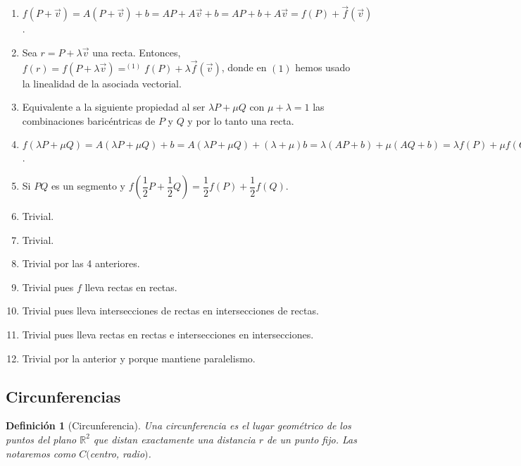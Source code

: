 \documentclass[11pt, a4paper]{article}
\makeatletter
\newif\IfInSansMode
\let\oldsf\sffamily
\renewcommand*{\sffamily}{\oldsf\mathversion{sans}\InSansModetrue}
\let\oldnorm\normalfont
\renewcommand*{\normalfont}{\oldnorm\InSansModefalse\mathversion{normal}}
\renewenvironment{proof}[1][\proofname] {\vspace{-15pt}\par\pushQED{\qed}\normalfont\topsep6\p@\@plus6\p@\relax\trivlist\item[\hskip\labelsep\it#1\@addpunct{.}]\ignorespaces}{\popQED\endtrivlist\@endpefalse}
\newcommand{\R}{\mathbb{R}}
\renewcommand{\vec}{\overrightarrow}
\renewenvironment{proof}[1][\proofname] {\par\pushQED{\qed}\normalfont\topsep6\p@\@plus6\p@\relax\trivlist\item[\hskip\labelsep\itshape\sffamily#1\@addpunct{.}]\ignorespaces}{\popQED\endtrivlist\@endpefalse}
\theoremstyle{theorem-style}
\theoremstyle{definition-style}
\newtheorem{ndef}{Definición}[section]
\theoremstyle{remark-style}
\newtheorem*{nota}{Nota}
\theoremstyle{example-style}
\makeatother
\begin{document}
\begin{proof}\hfill
  \begin{enumerate}
  \item $f(P+\vec{v}) = A(P+\vec{v}) + b = AP + A\vec{v} + b = AP + b + A\vec{v} = f(P) + \vec{f}(\vec{v})$.
  \item Sea $r = P + \lambda \vec{v}$ una recta. Entonces, $f(r) = f(P + \lambda \vec{v}) =^{(1)} f(P) + \lambda \vec{f}(\vec{v})$, donde en $(1)$ hemos usado la linealidad de la asociada vectorial.
  \item Equivalente a la siguiente propiedad al ser $\lambda P + \mu Q$ con $\mu+\lambda = 1$ las combinaciones baricéntricas de $P$ y $Q$ y por lo tanto una recta.
  \item $f(\lambda P + \mu Q) = A(\lambda P + \mu Q) + b =A(\lambda P + \mu Q) + (\lambda + \mu)b = \lambda (AP + b) + \mu (AQ + b) = \lambda f(P) + \mu f(Q)$.
  \item Si $PQ$ es un segmento y $f(\dfrac{1}{2}P + \dfrac{1}{2}Q) = \dfrac{1}{2}f(P) +  \dfrac{1}{2}f(Q)$.
  \item Trivial.
  \item Trivial.
  \item Trivial por las 4 anteriores.
  \item Trivial pues $f$ lleva rectas en rectas.
  \item Trivial pues lleva intersecciones de rectas en intersecciones de rectas.
  \item Trivial pues lleva rectas en rectas e intersecciones en intersecciones.
  \item Trivial por la anterior y porque mantiene paralelismo.

    
  \end{enumerate}
\end{proof}




\subsection{Circunferencias}

\begin{ndef}[Circunferencia]
  Una circunferencia es el lugar geométrico de los puntos del plano $\R^2$ que distan exactamente una distancia $r$ de un punto fijo. Las notaremos como $C($centro, radio$)$.
\end{ndef}
\end{document}
